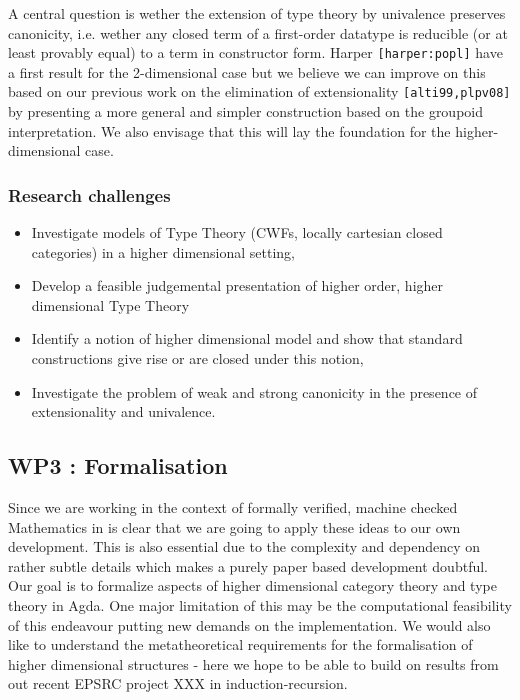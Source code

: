 \documentclass[a4paper]{article}
\renewcommand{\cite}[1]{{\tt[#1]}}
\begin{document}
A central question is wether the extension of type theory by
univalence preserves canonicity, i.e. wether any closed term of a
first-order datatype is reducible (or at least provably equal) to a
term in constructor form. Harper \cite{harper:popl} have a first
result for the 2-dimensional case but we believe we can improve on
this based on our previous work on the elimination of extensionality
\cite{alti99,plpv08} by presenting a more general and simpler
construction based on the groupoid interpretation. We also envisage
that this will lay the foundation for the higher-dimensional case.

\subsubsection*{Research challenges}
\label{sec:rsearch-challenges}

\begin{itemize}
\item Investigate models of Type Theory (CWFs, locally cartesian
  closed categories) in a higher dimensional setting,

\item Develop a feasible judgemental presentation of higher order,
  higher dimensional Type Theory

\item Identify a notion of higher dimensional model and show that
  standard constructions give rise or are closed under this notion,

\item Investigate the problem of weak and strong canonicity
  in the presence of extensionality and univalence.
\end{itemize}

\subsection*{WP3 : Formalisation} 
\label{sec:wp:qio}

Since we are working in the context of formally verified, machine
checked Mathematics in is clear that we are going to apply these ideas
to our own development. This is also essential due to the complexity
and dependency on rather subtle details which makes a purely paper
based development doubtful. Our goal is to formalize aspects of higher
dimensional category theory and type theory in Agda. One major
limitation of this may be the computational feasibility of this
endeavour putting new demands on the implementation. We would also
like to understand the metatheoretical requirements for the
formalisation of higher dimensional structures - here we hope to be
able to build on results from out recent EPSRC project XXX in
induction-recursion. 
\end{document}
